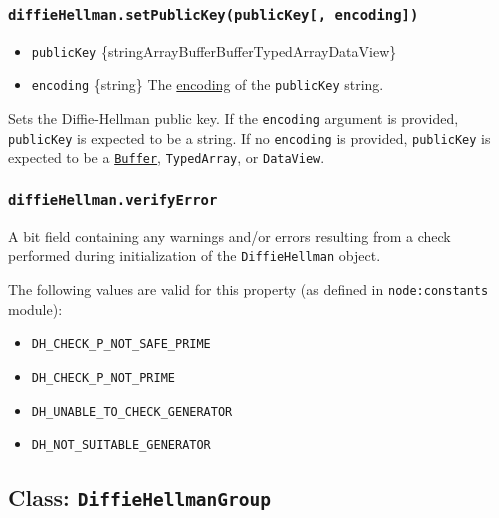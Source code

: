 \subsubsection{\texorpdfstring{\texttt{diffieHellman.setPublicKey(publicKey{[},\ encoding{]})}}{diffieHellman.setPublicKey(publicKey{[}, encoding{]})}}\label{diffiehellman.setpublickeypublickey-encoding}

\begin{itemize}
\tightlist
\item
  \texttt{publicKey}
  \{string\textbar ArrayBuffer\textbar Buffer\textbar TypedArray\textbar DataView\}
\item
  \texttt{encoding} \{string\} The
  \href{buffer.md\#buffers-and-character-encodings}{encoding} of the
  \texttt{publicKey} string.
\end{itemize}

Sets the Diffie-Hellman public key. If the \texttt{encoding} argument is
provided, \texttt{publicKey} is expected to be a string. If no
\texttt{encoding} is provided, \texttt{publicKey} is expected to be a
\href{buffer.md}{\texttt{Buffer}}, \texttt{TypedArray}, or
\texttt{DataView}.

\subsubsection{\texorpdfstring{\texttt{diffieHellman.verifyError}}{diffieHellman.verifyError}}\label{diffiehellman.verifyerror}

A bit field containing any warnings and/or errors resulting from a check
performed during initialization of the \texttt{DiffieHellman} object.

The following values are valid for this property (as defined in
\texttt{node:constants} module):

\begin{itemize}
\tightlist
\item
  \texttt{DH\_CHECK\_P\_NOT\_SAFE\_PRIME}
\item
  \texttt{DH\_CHECK\_P\_NOT\_PRIME}
\item
  \texttt{DH\_UNABLE\_TO\_CHECK\_GENERATOR}
\item
  \texttt{DH\_NOT\_SUITABLE\_GENERATOR}
\end{itemize}

\subsection{\texorpdfstring{Class:
\texttt{DiffieHellmanGroup}}{Class: DiffieHellmanGroup}}\label{class-diffiehellmangroup}

